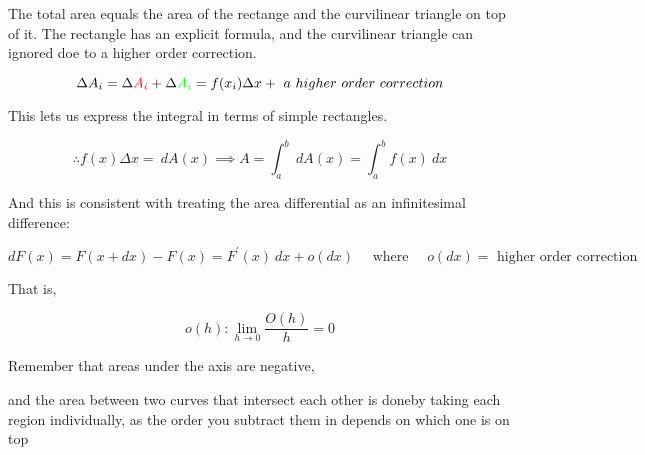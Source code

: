 \documentclass{article}
\begin{document}
The total area equals the area of the rectange and the curvilinear triangle on top of it. The rectangle has an explicit formula, and the curvilinear triangle can ignored doe to a higher order correction.

\[\Delta A_i=\Delta\color{red}A_i\color{black}+\Delta\color{green}A_i\color{black}=f(x_i)\Delta x+\ a\ higher\ order\ correction\]

This lets us express the integral in terms of simple rectangles.

\[\therefore f(x)\Delta x=\ dA(x)\implies A=\int_a^b\ dA(x)=\int_a^bf(x)\ dx\]

And this is consistent with treating the area differential as an infinitesimal difference:

\[dF(x)=F(x+dx)-F(x)=F^\prime(x)\ dx+o(dx)\quad\mbox{ where }\quad o(dx)=\mbox{ higher order correction}\]

That is,

\[o(h):\lim_{h\to0}\frac{O(h)}{h}=0\]

\newpage
Remember that areas under the axis are negative,


and the area between two curves that intersect each other is doneby taking each region individually, as the order you subtract them in depends on which one is on top

\end{document}
